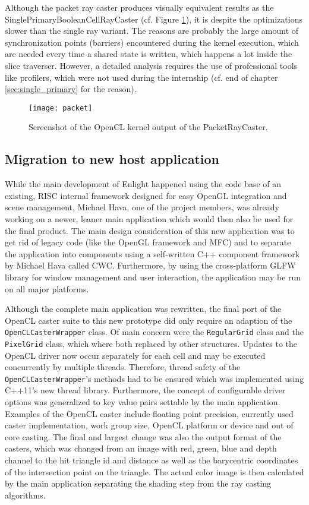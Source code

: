 Although the packet ray caster produces visually equivalent results as the SinglePrimaryBooleanCellRayCaster (cf. Figure \ref{fig:packet}), it is despite the optimizations slower than the single ray variant. The reasons are probably the large amount of synchronization points (barriers) encountered during the kernel execution, which are needed every time a shared state is written, which happens a lot inside the slice traverser. However, a detailed analysis requires the use of professional tools like profilers, which were not used during the internship (cf. end of chapter \ref{sec:single_primary} for the reason).


\begin{figure}
\centering
\texttt{[image: packet]}
\caption{Screenshot of the OpenCL kernel output of the PacketRayCaster.}
\label{fig:packet}
\end{figure}

\subsection{Migration to new host application}
\label{sec:migration}

While the main development of Enlight happened using the code base of an existing, RISC internal framework designed for easy OpenGL integration and scene management, Michael Hava, one of the project members, was already working on a newer, leaner main application which would then also be used for the final product. The main design consideration of this new application was to get rid of legacy code (like the OpenGL framework and MFC) and to separate the application into components using a self-written C++ component framework by Michael Hava called CWC. Furthermore, by using the cross-platform GLFW library for window management and user interaction, the application may be run on all major platforms.

Although the complete main application was rewritten, the final port of the OpenCL caster suite to this new prototype did only require an adaption of the \lstinline!OpenCLCasterWrapper! class. Of main concern were the \lstinline!RegularGrid! class and the \lstinline!PixelGrid! class, which where both replaced by other structures. Updates to the OpenCL driver now occur separately for each cell and may be executed concurrently by multiple threads. Therefore, thread safety of the \lstinline!OpenCLCasterWrapper!'s methods had to be ensured which was implemented using C++11's new thread library. Furthermore, the concept of configurable driver options was generalized to key value pairs settable by the main application. Examples of the OpenCL caster include floating point precision, currently used caster implementation, work group size, OpenCL platform or device and out of core casting. The final and largest change was also the output format of the casters, which was changed from an image with red, green, blue and depth channel to the hit triangle id and distance as well as the barycentric coordinates of the intersection point on the triangle. The actual color image is then calculated by the main application separating the shading step from the ray casting algorithms.


